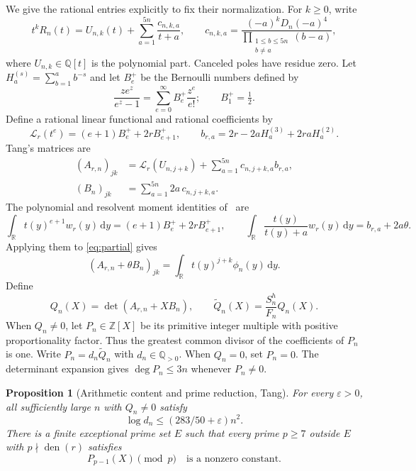\documentclass[11pt]{article}
\newtheorem{proposition}[theorem]{Proposition}
\numberwithin{equation}{section}
\newcommand{\Q}{\mathbb Q}
\newcommand{\R}{\mathbb R}
\newcommand{\Z}{\mathbb Z}
\newcommand{\dd}{\,\mathrm d}
\begin{document}
We give the rational entries explicitly to fix their normalization.
For $k\geq0$, write
\begin{equation}\label{eq:partial}
 t^kR_n(t)=U_{n,k}(t)+\sum_{a=1}^{5n}\frac{c_{n,k,a}}{t+a},
 \qquad
 c_{n,k,a}=\frac{(-a)^kD_n(-a)^4}
                    {\prod_{\substack{1\leq b\leq5n\\b\ne a}}(b-a)},
\end{equation}
where $U_{n,k}\in\Q[t]$ is the polynomial part. Canceled poles have
residue zero. Let $H_a^{(s)}=\sum_{b=1}^a b^{-s}$ and let $B_e^+$ be
the Bernoulli numbers defined by
\[
 \frac{ze^z}{e^z-1}=\sum_{e=0}^{\infty}B_e^+\frac{z^e}{e!};
 \qquad B_1^+=\tfrac12.
\]
Define a rational linear functional and rational coefficients by
\[
 \mathcal L_r(t^e)=(e+1)B_e^++2rB_{e+1}^+,
 \qquad b_{r,a}=2r-2aH_a^{(3)}+2raH_a^{(2)}.
\]
Tang's matrices are
\begin{equation}\label{eq:matrix}
 \begin{split}
 (A_{r,n})_{jk}&=\mathcal L_r(U_{n,j+k})+
                          \sum_{a=1}^{5n}c_{n,j+k,a}b_{r,a},\\
 (B_n)_{jk}&=\sum_{a=1}^{5n}2a\,c_{n,j+k,a}.
 \end{split}
\end{equation}
The polynomial and resolvent moment identities of~\cite{Tang} are
\[
 \int_\R t(y)^{e+1}w_r(y)\dd y=(e+1)B_e^++2rB_{e+1}^+,
 \qquad
 \int_\R\frac{t(y)}{t(y)+a}w_r(y)\dd y=b_{r,a}+2a\theta.
\]
Applying them to \eqref{eq:partial} gives
\begin{equation}\label{eq:entries}
 (A_{r,n}+\theta B_n)_{jk}
       =\int_\R t(y)^{j+k}\phi_n(y)\dd y.
\end{equation}
Define
\[
 Q_n(X)=\det(A_{r,n}+XB_n),\qquad
 \widetilde Q_n(X)=\frac{S_n^h}{F_n}Q_n(X).
\]
When $Q_n\ne0$, let $P_n\in\Z[X]$ be its primitive integer multiple
with positive proportionality factor. Thus the greatest common divisor
of the coefficients of $P_n$ is one. Write
$P_n=d_n\widetilde Q_n$ with $d_n\in\Q_{>0}$.
When $Q_n=0$, set $P_n=0$. The determinant expansion gives
$\deg P_n\leq3n$ whenever $P_n\ne0$.

\begin{proposition}[Arithmetic content and prime reduction, Tang]
\label{prop:inputs}
For every $\varepsilon>0$, all sufficiently large $n$ with $Q_n\ne0$
satisfy
\begin{equation}\label{eq:arith}
                         \log d_n\leq(283/50+\varepsilon)n^2.
\end{equation}
There is a finite exceptional prime set $E$ such that every prime
$p\geq7$ outside $E$ with $p\nmid\operatorname{den}(r)$ satisfies
\begin{equation}\label{eq:edge}
             P_{p-1}(X)\pmod p\quad\text{is a nonzero constant}.
\end{equation}
\end{proposition}
\end{document}
